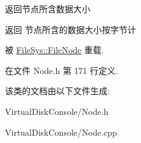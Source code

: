 返回节点所含数据大小 

\begin{DoxyReturn}{返回}
节点所含的数据大小按字节计 
\end{DoxyReturn}


被 \hyperlink{class_file_sys_1_1_file_node_ac66c3549ac94e6ca8e5adde3970f6421}{File\-Sys\-::\-File\-Node} 重载.



在文件 Node.\-h 第 171 行定义.



该类的文档由以下文件生成\-:\begin{DoxyCompactItemize}
\item 
Virtual\-Disk\-Console/Node.\-h\item 
Virtual\-Disk\-Console/Node.\-cpp\end{DoxyCompactItemize}
